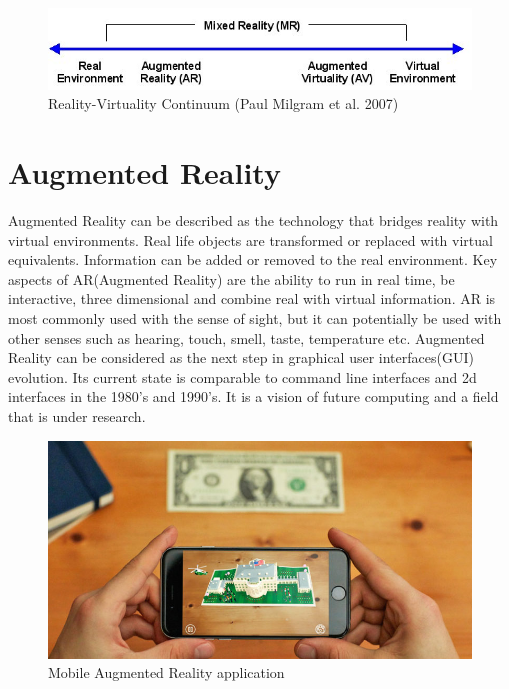 \documentclass[12pt, a4paper,oneside, nocenter]{thesis}
\begin{document}
\begin{figure}[H]
\includegraphics[width=\textwidth]{Virtuality_Continuum_2}
\caption{Reality-Virtuality Continuum (Paul Milgram et al. 2007)}
\label{fig:reality-virtuality}
\end{figure}

\section{Augmented Reality}%
Augmented Reality can be described as the technology that bridges reality with virtual environments. Real life objects are transformed or replaced with virtual equivalents. Information can be added or removed to the real environment. Key aspects of AR(Augmented Reality) are the ability to run in real time, be interactive, three dimensional and combine real with virtual information. AR is most commonly used with the sense of sight, but it can potentially be used with other senses such as hearing, touch, smell, taste, temperature etc. Augmented Reality can be considered as the next step in graphical user interfaces(GUI) evolution\citep{prototyping-ar}. Its current state is comparable to command line interfaces and 2d interfaces in the 1980's and 1990's. It is a vision of future computing and a field that is under research.
\begin{figure}[H]
	\includegraphics[width=\textwidth]{ar-application}
	\caption{Mobile Augmented Reality application\citep{ar-application-whitehouse}}
	\label{fig:ar-application}
\end{figure}
\end{document}

